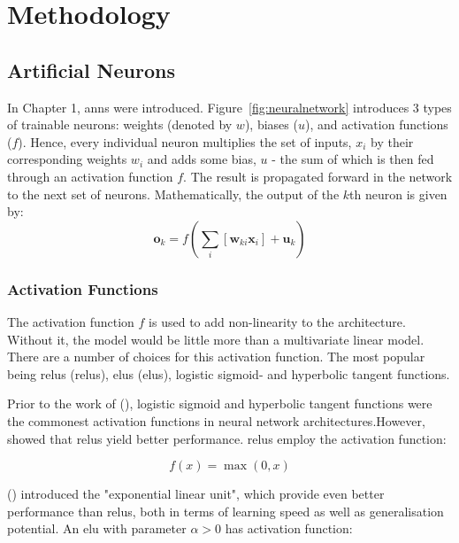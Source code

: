 \documentclass[11pt,oneside,openany,a4paper,english, report, goldenblock
]{usthesis}
\begin{document}
\chapter{Methodology}
\label{chapter:methodology}

\section{Artificial Neurons}
\label{section:artificial_neurons}

In Chapter 1, \acrshort{ann}s were introduced. Figure~\ref{fig:neuralnetwork} introduces 3 types of trainable neurons: weights (denoted by $w$), biases ($u$), and activation functions ($f$). Hence, every individual neuron multiplies the set of inputs, $x_i$ by their corresponding weights $w_i$ and adds some bias, $u$ - the sum of which is then fed through an activation function $f$. The result is propagated forward in the network to the next set of neurons. Mathematically, the output of the $k$th neuron is given by:
\begin{equation}
\mathbf{o}_k = f\left(\sum_i \left[ \mathbf{w}_{ki} \mathbf{x}_i \right] + \mathbf{u}_k\right)
\end{equation}

\subsection{Activation Functions}
The activation function $f$ is used to add non-linearity to the architecture. Without it, the model would be little more than a multivariate linear model. There are a number of choices for this activation function. The most popular being \acrlong{relu}s (\acrshort{relu}s), \acrlong{elu}s (\acrshort{elu}s), logistic sigmoid- and hyperbolic tangent functions.

Prior to the work of  (\citeyear{glorot2011deep}), logistic sigmoid and hyperbolic tangent functions were the commonest activation functions in neural network architectures.However, \citet{glorot2011deep} showed that \acrshort{relu}s yield better performance. \acrshort{relu}s employ the activation function:

\begin{equation}
f\left(x\right) = \max\left(0, x\right)
\end{equation}

 (\citeyear{DBLP:journals/corr/ClevertUH15}) introduced the "exponential linear unit", which provide even better performance than \acrshort{relu}s, both in terms of learning speed as well as generalisation potential. An \acrshort{elu} with parameter $\alpha > 0$ has activation function:
\end{document}

